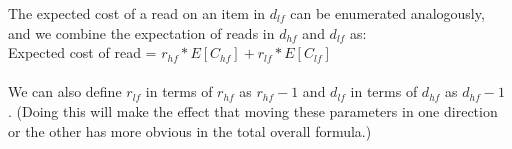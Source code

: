 \documentclass[11pt]{article}
\theoremstyle{plain}
\theoremstyle{definition}
\begin{document}
The expected cost of a read on an item in $d_{lf}$ can be enumerated analogously, and we combine the expectation of reads in $d_{hf}$ and $d_{lf}$ as: \\
Expected cost of read = $r_{hf} * E[C_{hf}] + r_{lf} * E[C_{lf}]$ \\ \\
We can also define $r_{lf}$ in terms of $r_{hf}$ as $r_{hf} - 1$ and  $d_{lf}$ in terms of $d_{hf}$ as $d_{hf} - 1$ . (Doing this will make the effect that moving these parameters in one direction or the other has more obvious in the total overall formula.)

%
\end{document}
